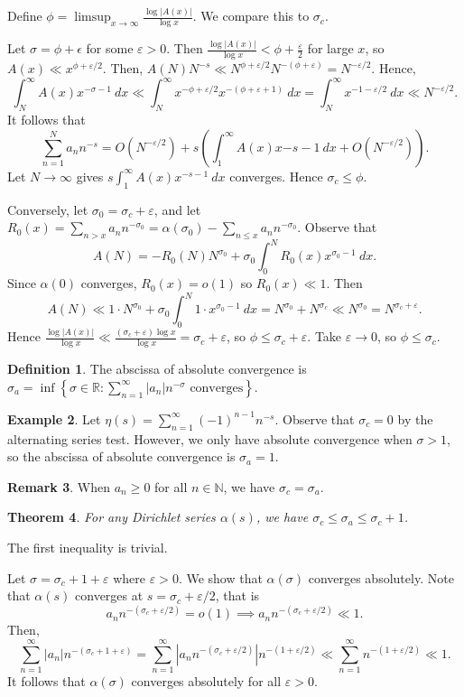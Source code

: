\documentclass[11pt]{article}
\newtheorem{thm}{Theorem}[section]
\theoremstyle{definition}
\newtheorem{defn}[thm]{Definition}
\newtheorem{example}[thm]{Example}
\newtheorem{remark}[thm]{Remark}
\newcommand{\set}[1]{\left\{ #1 \right\}}
\newcommand{\s}[0]{\sigma}
\newcommand{\e}[0]{\varepsilon}
\newcommand{\abs}[1]{\left\lvert#1\right\rvert} %
\newcommand{\RR}{\mathbb{R}}
\newcommand{\NN}{\mathbb{N}}
\begin{document}
Define $\phi=\limsup_{x\to\infty}\frac{\log\abs{A(x)}}{\log x}$. We compare this to $\s_c$.

Let $\s=\phi+\epsilon$ for some $\e>0$. Then $\frac{\log\abs{A(x)}}{\log x}<\phi+\frac\e2$
for large $x$, so $A(x)\ll x^{\phi+\e/2}$. Then, $A(N)N^{-s}\ll N^{\phi+\e/2}N^{-(\phi+\e)}
= N^{-\e/2}$. Hence,
\[
  \int_N^\infty A(x)x^{-\s-1} ~dx \ll \int_N^\infty x^{-\phi+\e/2}x^{-(\phi+\e+1)} ~dx
  = \int_N^\infty x^{-1-\e/2} ~dx \ll N^{-\e/2} .
\]
It follows that
\[
  \sum_{n=1}^N a_nn^{-s}
  = O(N^{-\e/2}) + s\left(\int_1^\infty A(x)x{-s-1} ~dx + O(N^{-\e/2})\right) .
\]
Let $N\to\infty$ gives $s\int_1^\infty A(x)x^{-s-1} ~dx$ converges. Hence
$\sigma_c\le\phi$.

Conversely, let $\s_0=\s_c+\e$, and let
$R_0(x)=\sum_{n>x}a_nn^{-\s_0}=\alpha(\s_0)-\sum_{n\le x}a_nn^{-\s_0}$. Observe that
\[
  A(N) = -R_0(N)N^{\s_0} + \s_0\int_0^NR_0(x)x^{\s_0-1} ~dx .
\]
Since $\alpha(0)$ converges, $R_0(x)=o(1)$ so $R_0(x)\ll1$. Then
\[
  A(N) \ll 1 \cdot N^{\s_0} + \s_0\int_0^N 1\cdot x^{\s_0-1} ~dx
  = N^{\s_0}+N^{\s_c} \ll N^{\s_0} = N^{\s_c+\e} .
\]
Hence $\frac{\log\abs{A(x)}}{\log x} \ll \frac{(\s_c+\e)\log x}{\log x} = \s_c+\e$, so
$\phi\le\s_c+\e$. Take $\e\to0$, so $\phi\le\s_c$.
\qedhere



\begin{defn}
The abscissa of absolute convergence is
$\s_a=\inf\set{\s\in\RR:\sum_{n=1}^\infty\abs{a_n}n^{-\s}\text{ converges}}$.
\end{defn}

\begin{example}
Let $\eta(s)=\sum_{n=1}^\infty(-1)^{n-1}n^{-s}$. Observe that $\s_c=0$ by the alternating
series test. However, we only have absolute convergence when $\s>1$, so the abscissa of
absolute convergence is $\s_a=1$.
\end{example}

\begin{remark}
When $a_n\ge0$ for all $n\in\NN$, we have $\s_c=\s_a$.
\end{remark}

\begin{thm}
For any Dirichlet series $\alpha(s)$, we have $\s_c\le\s_a\le\s_c+1$.
\end{thm}
\proof
The first inequality is trivial.

Let $\s=\s_c+1+\e$ where $\e>0$. We show that $\alpha(\s)$ converges absolutely. Note that
$\alpha(s)$ converges at $s=\s_c+\e/2$, that is
\[
  a_nn^{-(\s_c+\e/2)} = o(1) \implies a_nn^{-(\s_c+\e/2)} \ll 1 .
\]
Then,
\[
  \sum_{n=1}^\infty\abs{a_n}n^{-(\s_c+1+\e)}
  = \sum_{n=1}^\infty\abs{a_nn^{-(\s_c+\e/2)}}n^{-(1+\e/2)}
  \ll \sum_{n=1}^\infty n^{-(1+\e/2)} \ll 1 .
\]
It follows that $\alpha(\s)$ converges absolutely for all $\e>0$.
\qedhere
\end{document}
